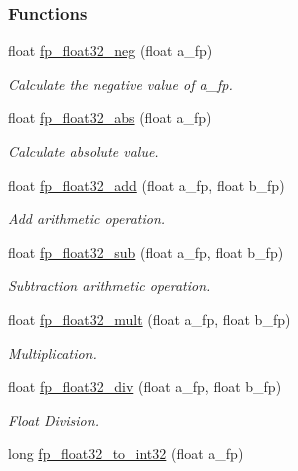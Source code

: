 \subsubsection*{Functions}
\begin{DoxyCompactItemize}
\item 
float \mbox{\hyperlink{a00023_a4702619cb8ca993b69919e1d7ca71f57}{fp\+\_\+float32\+\_\+neg}} (float a\+\_\+fp)
\begin{DoxyCompactList}\small\item\em Calculate the negative value of a\+\_\+fp. \end{DoxyCompactList}\item 
float \mbox{\hyperlink{a00023_a50dbb1be8035ed17c71df34d180056e0}{fp\+\_\+float32\+\_\+abs}} (float a\+\_\+fp)
\begin{DoxyCompactList}\small\item\em Calculate absolute value. \end{DoxyCompactList}\item 
float \mbox{\hyperlink{a00023_a05d59640c2e2b66e3f13e423c0779ce9}{fp\+\_\+float32\+\_\+add}} (float a\+\_\+fp, float b\+\_\+fp)
\begin{DoxyCompactList}\small\item\em Add arithmetic operation. \end{DoxyCompactList}\item 
float \mbox{\hyperlink{a00023_a131916cff95f607242ea6affe3e50382}{fp\+\_\+float32\+\_\+sub}} (float a\+\_\+fp, float b\+\_\+fp)
\begin{DoxyCompactList}\small\item\em Subtraction arithmetic operation. \end{DoxyCompactList}\item 
float \mbox{\hyperlink{a00023_a4fb177861851cf018559768551298993}{fp\+\_\+float32\+\_\+mult}} (float a\+\_\+fp, float b\+\_\+fp)
\begin{DoxyCompactList}\small\item\em Multiplication. \end{DoxyCompactList}\item 
float \mbox{\hyperlink{a00023_a02a02cf636799092e56f66a57d90d91b}{fp\+\_\+float32\+\_\+div}} (float a\+\_\+fp, float b\+\_\+fp)
\begin{DoxyCompactList}\small\item\em Float Division. \end{DoxyCompactList}\item 
long \mbox{\hyperlink{a00023_aab3c64f665ae99d4f267aef56d96be03}{fp\+\_\+float32\+\_\+to\+\_\+int32}} (float a\+\_\+fp)

\end{DoxyCompactItemize}

